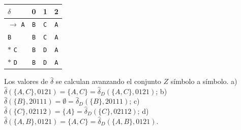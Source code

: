 \documentclass[11pt]{article}
\begin{document}
\begin{center}\small\begin{tabular}{lccc}\toprule
$\delta$ & 0 & 1 & 2 \\\midrule
$\to$ \texttt{A} & \texttt{B} & \texttt{C} & \texttt{A} \\
 \texttt{B} & \texttt{B} & \texttt{C} & \texttt{A} \\
$*$ \texttt{C} & \texttt{B} & \texttt{D} & \texttt{A} \\
$*$ \texttt{D} & \texttt{B} & \texttt{D} & \texttt{A} \\
\bottomrule\end{tabular}\end{center}
Los valores de $\hat\delta$ se calculan avanzando el conjunto $Z$ símbolo a símbolo.
\resp a) $\hat\delta(\{A, C\}, 0121) = \{A, C\} = \hat\delta_D(\{A, C\}, 0121)$; b) $\hat\delta(\{B\}, 20111) = ∅ = \hat\delta_D(\{B\}, 20111)$; c) $\hat\delta(\{C\}, 02112) = \{A\} = \hat\delta_D(\{C\}, 02112)$; d) $\hat\delta(\{A, B\}, 0121) = \{A, C\} = \hat\delta_D(\{A, B\}, 0121)$.
\end{document}
